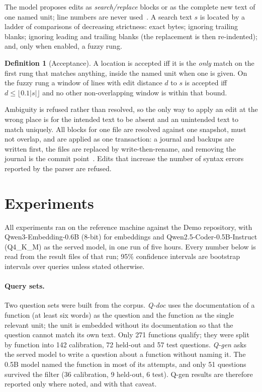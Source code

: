 \documentclass[10pt,twocolumn]{article}
\theoremstyle{definition}
\newtheorem{definition}{Definition}
\theoremstyle{remark}
\begin{document}
The model proposes edits as \emph{search/replace} blocks or as the complete new text of one named unit; line numbers are never used~\cite{aider_editformats,yang2024sweagent}.
A search text $s$ is located by a ladder of comparisons of decreasing strictness: exact bytes; ignoring trailing blanks; ignoring leading and trailing blanks (the replacement is then re-indented); and, only when enabled, a fuzzy rung.
\begin{definition}[Acceptance]
A location is accepted iff it is the \emph{only} match on the first rung that matches anything, inside the named unit when one is given.
On the fuzzy rung a window of lines with edit distance $d$ to $s$ is accepted iff $d\le\lfloor0.1|s|\rfloor$ and no other non-overlapping window is within that bound.
\end{definition}
Ambiguity is refused rather than resolved, so the only way to apply an edit at the wrong place is for the intended text to be absent and an unintended text to match uniquely.
All blocks for one file are resolved against one snapshot, must not overlap, and are applied as one transaction: a journal and backups are written first, the files are replaced by write-then-rename, and removing the journal is the commit point~\cite{pillai2014crash}.
Edits that increase the number of syntax errors reported by the parser are refused.

\section{Experiments}\label{sec:results}

All experiments ran on the reference machine against the Demo repository, with Qwen3-Embedding-0.6B (8-bit) for embeddings and Qwen2.5-Coder-0.5B-Instruct (Q4\_K\_M) as the served model, in one run of five hours.
Every number below is read from the result files of that run; 95\% confidence intervals are bootstrap intervals over queries unless stated otherwise.

\paragraph{Query sets.}
Two question sets were built from the corpus.
\emph{Q-doc} uses the documentation of a function (at least six words) as the question and the function as the single relevant unit; the unit is embedded without its documentation so that the question cannot match its own text.
Only 271 functions qualify; they were split by function into 142 calibration, 72 held-out and 57 test questions.
\emph{Q-gen} asks the served model to write a question about a function without naming it.
The 0.5B model named the function in most of its attempts, and only 51 questions survived the filter (36 calibration, 9 held-out, 6 test).
Q-gen results are therefore reported only where noted, and with that caveat.
\end{document}
